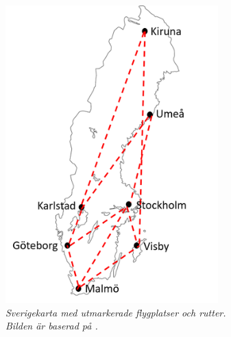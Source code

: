 \begin{figure}
    \hspace{0.4cm}
    \begin{subfigure}[b]{0.45\textwidth}
        \centering
        \includegraphics[width=0.9\textwidth]{Figures/Flygplan_rapport.png}
        \caption{\textsl{Sverigekarta med utmarkerade flygplatser och rutter. Bilden är baserad på \cite{SverigeKarta}.}}
        \label{fig:Flygplan}
    \end{subfigure}
    \hfill
    \begin{subfigure}[b]{0.45\textwidth}
        \centering

\end{subfigure}
\end{figure}
